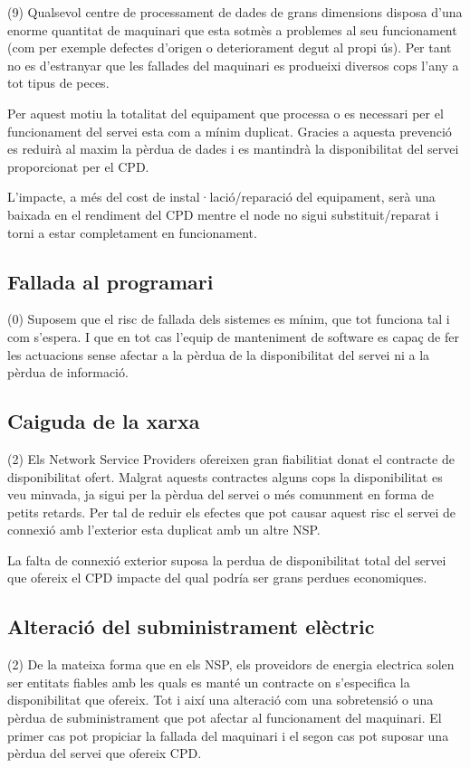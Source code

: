 \documentclass[a4paper, 11pt]{article}
\begin{document}
(9) Qualsevol centre de processament de dades de grans dimensions disposa d'una enorme quantitat de maquinari que esta sotmès a problemes al seu funcionament (com per exemple defectes d'origen o deteriorament degut al propi ús). Per tant no es d'estranyar que les fallades del maquinari es produeixi diversos cops l'any a tot tipus de peces.

Per aquest motiu la totalitat del equipament que processa o es necessari per el funcionament del servei esta com a mínim duplicat. Gracies a aquesta prevenció es reduirà al maxim la pèrdua de dades i es mantindrà la disponibilitat del servei proporcionat per el CPD. 

L'impacte, a més del cost de instal·lació/reparació del equipament, serà una baixada en el rendiment del CPD mentre el node no sigui substituit/reparat i torni a estar completament en funcionament.

\subsection{Fallada al programari}
(0) Suposem que el risc de fallada dels sistemes es mínim, que tot funciona tal i com s'espera. I que en tot cas l'equip de manteniment de software es capaç de fer les actuacions sense afectar a la pèrdua de la disponibilitat del servei ni a la pèrdua de informació. 

\subsection{Caiguda de la xarxa}
(2) Els Network Service Providers ofereixen gran fiabilitiat donat el contracte de disponibilitat ofert. Malgrat aquests contractes alguns cops la disponibilitat es veu minvada, ja sigui per la pèrdua del servei o més comunment en forma de petits retards. Per tal de reduir els efectes que pot causar aquest risc el servei de connexió amb l'exterior esta duplicat amb un altre NSP. 

La falta de connexió exterior suposa la perdua de disponibilitat total del servei que ofereix el CPD impacte del qual podría ser grans perdues economiques.

\subsection{Alteració del subministrament elèctric}
(2) De la mateixa forma que en els NSP, els proveidors de energia electrica solen ser entitats fiables amb les quals es manté un contracte on s'especifica la disponibilitat que ofereix. Tot i així una alteració com una sobretensió o una pèrdua de subministrament que pot afectar al funcionament del maquinari. El primer cas pot propiciar la fallada del maquinari i el segon cas pot suposar una pèrdua del servei que ofereix CPD.
\end{document}
